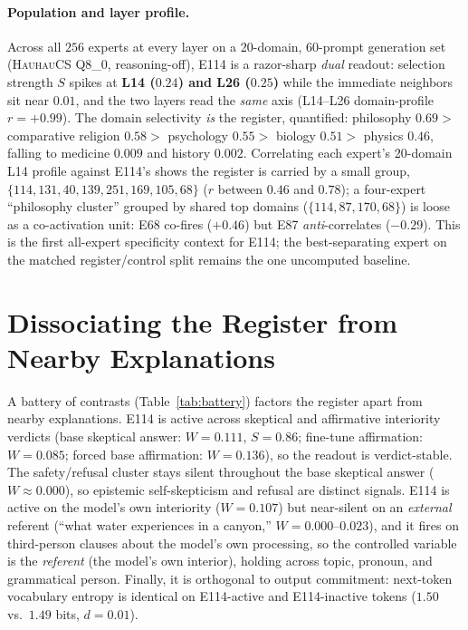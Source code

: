 \documentclass[10pt,a4paper,twocolumn]{article}
\newcommand{\W}{\textit{W}}
\newcommand{\Sel}{\textit{S}}
\begin{document}
\paragraph{Population and layer profile.}
Across all $256$ experts at every layer on a 20-domain, 60-prompt generation set
(\textsc{HauhauCS} Q8\_0, reasoning-off), E114 is a razor-sharp \emph{dual} readout:
selection strength $\Sel$ spikes at \textbf{L14 ($0.24$) and L26 ($0.25$)} while
the immediate neighbors sit near $0.01$, and the two layers read the \emph{same}
axis (L14--L26 domain-profile $r{=}{+}0.99$). The domain selectivity \emph{is} the
register, quantified: philosophy $0.69 >$ comparative religion $0.58 >$ psychology
$0.55 >$ biology $0.51 >$ physics $0.46$, falling to medicine $0.009$ and history
$0.002$. Correlating each expert's 20-domain L14 profile against E114's shows the
register is carried by a small group, $\{114,131,40,139,251,169,105,68\}$ ($r$
between $0.46$ and $0.78$); a four-expert ``philosophy cluster'' grouped by shared
top domains ($\{114,87,170,68\}$) is loose as a co-activation unit: E68 co-fires
($+0.46$) but E87 \emph{anti}-correlates ($-0.29$). This is the first all-expert specificity context for E114; the
best-separating expert on the matched register/control split remains the one
uncomputed baseline.

\section{Dissociating the Register from Nearby Explanations}

A battery of contrasts (Table~\ref{tab:battery}) factors the register apart from
nearby explanations. E114 is active across skeptical and affirmative interiority
verdicts (base skeptical answer: $\W{=}0.111$, $\Sel{=}0.86$; fine-tune
affirmation: $\W{=}0.085$; forced base affirmation: $\W{=}0.136$), so the
readout is verdict-stable. The safety/refusal cluster stays silent throughout the
base skeptical answer ($\W{\approx}0.000$), so epistemic self-skepticism and
refusal are distinct signals.
E114 is active on the model's own interiority ($\W{=}0.107$) but near-silent on an
\emph{external} referent (``what water experiences in a canyon,''
$\W{=}0.000$--$0.023$), and it fires on third-person clauses about the model's own
processing, so the controlled variable is the \emph{referent} (the model's own
interior), holding across topic, pronoun, and grammatical person. Finally, it is orthogonal to output commitment: next-token
vocabulary entropy is identical on E114-active and E114-inactive tokens ($1.50$
vs.\ $1.49$ bits, $d{=}0.01$).
\end{document}
